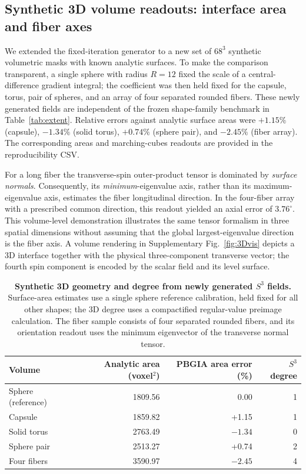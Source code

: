 \documentclass[11pt,a4paper]{article}
\begin{document}
\subsection{Synthetic 3D volume readouts: interface area and fiber axes}\label{subsec:impl:3dvolume}
We extended the fixed-iteration generator to a new set of $68^3$ synthetic volumetric masks with known analytic surfaces. To make the comparison transparent, a single sphere with radius $R=12$ fixed the scale of a central-difference gradient integral; the coefficient was then held fixed for the capsule, torus, pair of spheres, and an array of four separated rounded fibers. These newly generated fields are independent of the frozen shape-family benchmark in Table~\ref{tab:extent}. Relative errors against analytic surface areas were $+1.15\%$ (capsule), $-1.34\%$ (solid torus), $+0.74\%$ (sphere pair), and $-2.45\%$ (fiber array). The corresponding areas and marching-cubes readouts are provided in the reproducibility CSV.

For a long fiber the transverse-spin outer-product tensor is dominated by \emph{surface normals}. Consequently, its \emph{minimum}-eigenvalue axis, rather than its maximum-eigenvalue axis, estimates the fiber longitudinal direction. In the four-fiber array with a prescribed common direction, this readout yielded an axial error of $3.76^\circ$. This volume-level demonstration illustrates the same tensor formalism in three spatial dimensions without assuming that the global largest-eigenvalue direction is the fiber axis. A volume rendering in Supplementary Fig.~\ref{fig:3Dvis} depicts a 3D interface together with the physical three-component transverse vector; the fourth spin component is encoded by the scalar field and its level surface.

\begin{table}[t]
\centering\caption{\textbf{Synthetic 3D geometry and degree from newly generated $S^3$ fields.} Surface-area estimates use a single sphere reference calibration, held fixed for all other shapes; the 3D degree uses a compactified regular-value preimage calculation. The fiber sample consists of four separated rounded fibers, and its orientation readout uses the minimum eigenvector of the transverse normal tensor.}
\label{tab:3dnew}
\small\begin{tabular}{@{}lrrr@{}}\toprule
Volume & Analytic area (voxel$^2$) & PBGIA area error (\%) & $S^3$ degree \\\midrule
Sphere (reference) & 1809.56 & 0.00 & 1\\
Capsule & 1859.82 & +1.15 & 1\\
Solid torus & 2763.49 & $-1.34$ & 0\\
Sphere pair & 2513.27 & +0.74 & 2\\
Four fibers & 3590.97 & $-2.45$ & 4\\\bottomrule
\end{tabular}
\end{table}
\end{document}
